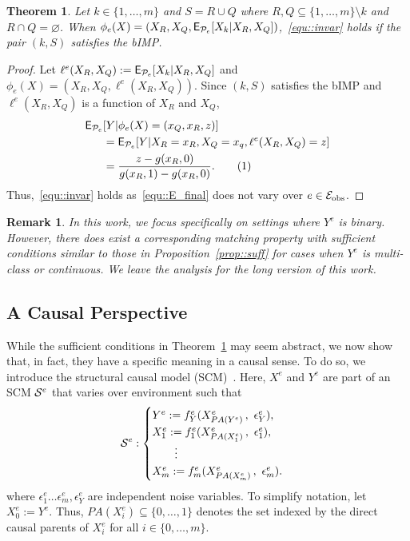 \documentclass[conference,letterpaper]{IEEEtran}
\newcommand\numberthis{\addtocounter{equation}{1}\tag{\theequation}}
\newtheorem{theorem}{Theorem}
\newtheorem{remark}{Remark}
\begin{document}
\begin{theorem} \label{the:1} 
Let $ k \in \{1,\ldots,m\}$ and $S = R \cup Q$ where $R,Q \subseteq \{1,\ldots,m\} \setminus k$ and $R \cap Q = \varnothing$.
When $\phi_e(X) = (X_R,X_Q,\operatorname{\sf E}_{\mathcal{P}_e}[X_k|X_R,X_Q])$,~\eqref{equ::invar} holds if the pair $(k,S)$ satisfies the bIMP. 
\end{theorem}
\begin{proof}

 Let $\ell^e(X_R,X_Q):=\operatorname{\sf E}_{\mathcal{P}_e}[X_k|X_R,X_Q]$ and $\phi_e(X) = (X_R,X_Q,\ell^e(X_R,X_Q))$. Since $(k,S)$ satisfies the bIMP and $\ell^e(X_R,X_Q)$ is a function of $X_R$ and $X_Q$,
\begin{align*}
      \E_{\Pc_e}&[Y|\phi_e(X) = (x_Q,x_R,z)] \\
      &=\E_{\Pc_e}[Y|X_R=x_R,X_Q=x_q,\ell^e(X_R,X_Q)=z] \\
      &= \frac{z - g(x_R,0)}{g(x_R,1) - g(x_R,0)}. \numberthis\label{equ::E_final}
\end{align*}
Thus,~\eqref{equ::invar} holds as~\eqref{equ::E_final} does not vary over $e\in\mathcal{E}_{\text{obs}}$.  
\end{proof}
\begin{remark}
    In this work, we focus specifically on settings where $Y^e$ is binary. However, there does exist a corresponding matching property with sufficient conditions similar to those in Proposition~\ref{prop::suff} for cases when $Y^e$ is multi-class or continuous. We leave the analysis for the long version of this work.
\end{remark}

\subsection{A Causal Perspective}\label{sec::causal}
While the sufficient conditions in Theorem~\ref{the:1} may seem abstract, we now show that, in fact, they have a specific meaning in a causal sense. To do so, we introduce the structural causal model (SCM)~\cite{pearl2009causality}. Here, $X^e$ and $Y^e$ are part of an SCM $\mathcal{S}^e$ that varies over environment such that 
\begin{equation} \label{equ:SCM}
    \Sc^e: \begin{cases}
    Y^e := f_Y^e(X^e_{PA(Y^e)}\, ,\ \epsilon^e_Y),\\
    X_1^e := f_1^e(X^e_{PA(X_1^e)}\, ,\ \epsilon^e_1),\\
    \qquad \vdots \\
    X_m^e := f_m^e(X^e_{PA(X_m^e)}\, ,\ \epsilon^e_m).	\end{cases}
\end{equation}
where $\epsilon_1^e\dots\epsilon_m^e,\epsilon_Y^e$ are independent noise variables. To simplify notation, let $X_0^e:=Y^e$. Thus, $PA(X_i^e)\subseteq\{0,\dots,1\}$ denotes the set indexed by the direct causal parents of $X_i^e$ for all $i\in\{0,\dots,m\}$.
\end{document}
